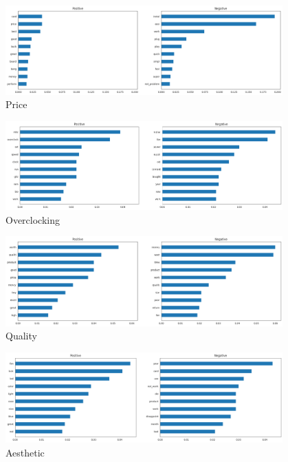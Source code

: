 \begin{figure}[p]
  \centering
  \includegraphics[width=0.95\textwidth]{images/experiments/T9-Price.png}
  \caption{Price}
  \label{fig:T9-Price}
\end{figure}

\begin{figure}[p]
  \centering
  \includegraphics[width=0.95\textwidth]{images/experiments/T17-Overclocking.png}
  \caption{Overclocking}
  \label{fig:T17-Overclocking}
\end{figure}

\begin{figure}[p]
  \centering
  \includegraphics[width=0.95\textwidth]{images/experiments/T26-Quality.png}
  \caption{Quality}
  \label{fig:T26-Quality}
\end{figure}

\newpage

\begin{figure}[ht]
  \centering
  \includegraphics[width=0.95\textwidth]{images/experiments/T28-Aesthetic.png}
  \caption{Aesthetic}
  \label{fig:T28-Aesthetic}
\end{figure}

